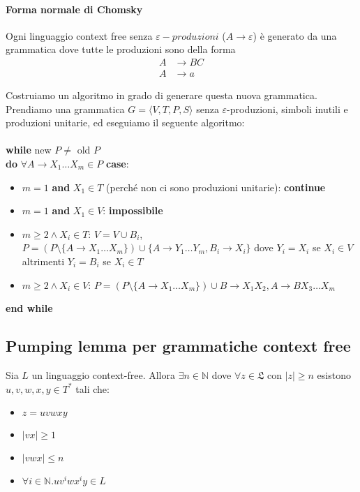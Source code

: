 \documentclass[a4paper, 10pt]{report}
\begin{document}
\paragraph*{Forma normale di Chomsky} Ogni linguaggio context free senza $\varepsilon - produzioni$ ($A \rightarrow \varepsilon$) è generato da una grammatica dove tutte le produzioni sono della forma 
\begin{align*}
A &\rightarrow BC\\
A &\rightarrow a
\end{align*}

\begin{tcolorbox}[title=\textbf{dimostrazione}]
Costruiamo un algoritmo in grado di generare questa nuova grammatica. Prendiamo una grammatica $G=\langle V,T,P,S\rangle$ senza $\varepsilon$-produzioni, simboli inutili e produzioni unitarie, ed eseguiamo il seguente algoritmo: \\\\
	\textbf{while} new $P\neq$ old $P$ \\
	\textbf{do} $\forall A\rightarrow X_1 \dots X_m \in P$ \textbf{case}:
	\begin{itemize}
		\item $m=1$ \textbf{and} $X_1\in T$ (perché non ci sono produzioni unitarie): \textbf{continue}
		\item $m=1$ \textbf{and} $X_1\in V$: \textbf{impossibile}
		
		\item $m\geq 2\land X_i\in T$: $V=V\cup{B_i}$, $P=(P\setminus\{A\rightarrow X_1\dots X_m\})\cup\{A\rightarrow Y_1 \ldots Y_m,B_i\rightarrow X_i\}$ dove $Y_i = X_i$ se $X_i \in V$ altrimenti $Y_i = B_i$ se $X_i\in T$
		\item $m\geq 2\land X_i\in V$: $P=(P\setminus\{A\rightarrow X_1\dots X_m\})\cup{B\rightarrow X_1 X_2, A\rightarrow B X_3\dots X_m}$
	\end{itemize}
	\textbf{end while}
\end{tcolorbox}

\subsection*{Pumping lemma per grammatiche context free}
Sia $L$ un linguaggio context-free. Allora $\exists n\in\mathbb{N}$ dove $\forall z\in \mathfrak{L}$ con $|z|\geq n$ esistono 
	$u,v,w,x,y\in T^*$ tali che:
	\begin{itemize}
		\item $z=uvwxy$
		\item $|vx|\geq 1$
		\item $|vwx|\leq n$
		\item $\forall i\in\mathbb{N}. uv^iwx^iy\in L$
	\end{itemize}
\end{document}
